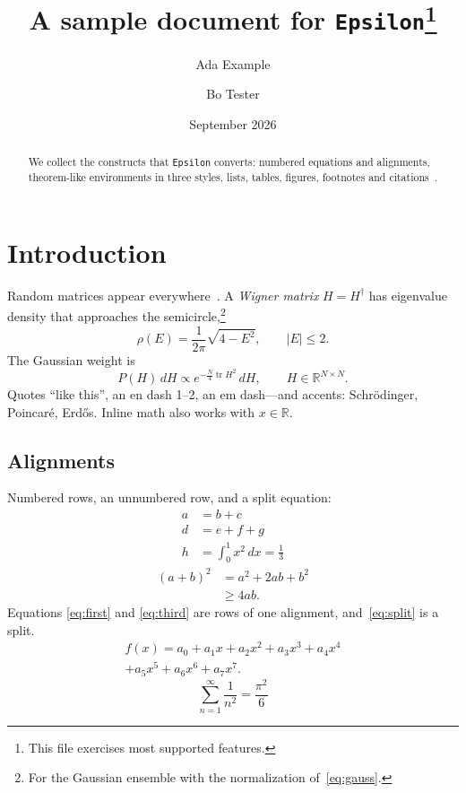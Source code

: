 \documentclass[11pt]{article}
\title{A sample document for \texttt{Epsilon}\thanks{This file exercises most supported features.}}
\author{Ada Example \and Bo Tester}
\date{September 2026}
\newcommand{\term}[1]{\emph{#1}}
\newcommand{\abs}[1]{\left|#1\right|}
\newcommand{\R}{\mathbb{R}}
\DeclareMathOperator{\tr}{tr}
\newcommand{\be}{\begin{equation}}
\newcommand{\ee}{\end{equation}}
\theoremstyle{definition}
\theoremstyle{remark}
\begin{document}
\maketitle

\begin{abstract}
We collect the constructs that \texttt{Epsilon} converts: numbered equations and
alignments, theorem-like environments in three styles, lists, tables, figures,
footnotes and citations~\cite{Dyson:1962,Mehta:2004}.
\end{abstract}

\section{Introduction}
\label{sec:intro}

Random matrices appear everywhere~\cite{Altland:1997}. A \term{Wigner matrix} $H=H^\dagger$ has
eigenvalue density that approaches the semicircle,\footnote{For the Gaussian ensemble with the
normalization of~\eqref{eq:gauss}.}
\be
\rho(E)=\frac{1}{2\pi}\sqrt{4-E^2},\qquad \abs{E}\le 2 .
\label{eq:semicircle}
\ee
The Gaussian weight is
\begin{equation}
P(H)\,dH\propto e^{-\frac{N}{4}\tr H^2}\,dH, \qquad H\in\R^{N\times N}.
\label{eq:gauss}
\end{equation}
Quotes ``like this'', an en dash 1--2, an em dash---and accents: Schr\"odinger, Poincar\'e, Erd\H{o}s.
Inline math also works with \(x\in\R\).

\subsection{Alignments}
Numbered rows, an unnumbered row, and a split equation:
\begin{align}
  a &= b + c \label{eq:first}\\
  d &= e + f + g \nonumber\\
  h &= \int_0^1 x^2\,dx = \frac13 \label{eq:third}
\end{align}
\begin{equation}
\begin{split}
  (a+b)^2 &= a^2 + 2ab + b^2\\
          &\ge 4ab .
\end{split}
\label{eq:split}
\end{equation}
Equations \eqref{eq:first} and \eqref{eq:third} are rows of one alignment, and~\eqref{eq:split} is a split.
\begin{multline}
  f(x) = a_0 + a_1 x + a_2 x^2 + a_3 x^3 + a_4 x^4 \\
  + a_5 x^5 + a_6 x^6 + a_7 x^7 .
\end{multline}
\[
  \sum_{n=1}^\infty \frac{1}{n^2} = \frac{\pi^2}{6}
\]
\end{document}
